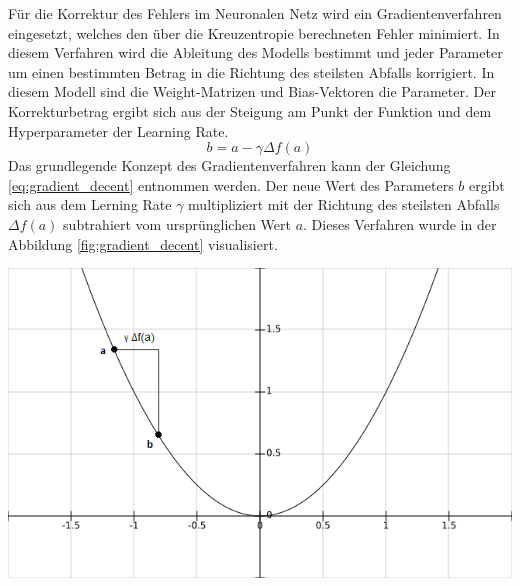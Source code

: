 \documentclass[Interploate_hadwritten_Digits.tex]{subfiles}
\begin{document}
	Für die Korrektur des Fehlers im Neuronalen Netz wird ein Gradientenverfahren eingesetzt, welches den über die Kreuzentropie berechneten Fehler minimiert. In diesem Verfahren wird die Ableitung des Modells bestimmt und jeder Parameter um einen bestimmten Betrag in die Richtung des steilsten Abfalls korrigiert. In diesem Modell sind die Weight-Matrizen und Bias-Vektoren die Parameter. Der Korrekturbetrag ergibt sich aus der Steigung am Punkt der Funktion und dem Hyperparameter der Learning Rate.
	\begin{equation}
	b = a - \gamma \Delta f(a)
	\label{eq:gradient_decent}
	\end{equation}
	Das grundlegende Konzept des Gradientenverfahren kann der Gleichung \ref{eq:gradient_decent} entnommen werden. Der neue Wert des Parameters $ b $ ergibt sich aus dem Lerning Rate $ \gamma $ multipliziert mit der Richtung des steilsten Abfalls $ \Delta f(a) $ subtrahiert vom ursprünglichen Wert $ a $. Dieses Verfahren wurde in der Abbildung \ref{fig:gradient_decent} visualisiert.
	\begin{Figure}
		\centering
		\includegraphics[width=\linewidth]{img/gradient_decent.png}
		\label{fig:gradient_decent}
	\end{Figure}
	
\end{document}

